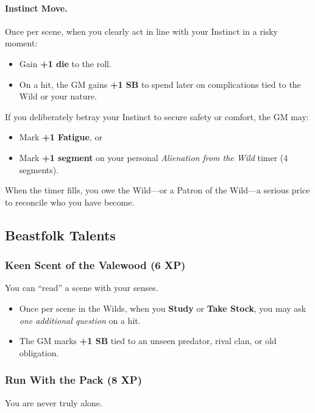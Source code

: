 \documentclass[11pt]{book}
\begin{document}
\paragraph{Instinct Move.}
Once per scene, when you clearly act in line with your Instinct in a risky moment:
\begin{itemize}
  \item Gain \textbf{+1 die} to the roll.
  \item On a hit, the GM gains \textbf{+1 SB} to spend later on complications tied to the Wild or your nature.
\end{itemize}

If you deliberately betray your Instinct to secure safety or comfort, the GM may:
\begin{itemize}
  \item Mark \textbf{+1 Fatigue}, or
  \item Mark \textbf{+1 segment} on your personal \emph{Alienation from the Wild} timer (4 segments).
\end{itemize}
When the timer fills, you owe the Wild---or a Patron of the Wild---a serious price to reconcile who you have become.

\subsection{Beastfolk Talents}
\label{subsec:beastfolk_talents}

\subsubsection{Keen Scent of the Valewood (6 XP)}
\label{talent:keen_scent_valewood}

You can ``read'' a scene with your senses.

\begin{itemize}
  \item Once per scene in the Wilds, when you \textbf{Study} or \textbf{Take Stock}, you may ask \emph{one additional question} on a hit.
  \item The GM marks \textbf{+1 SB} tied to an unseen predator, rival clan, or old obligation.
\end{itemize}

\subsubsection{Run With the Pack (8 XP)}
\label{talent:run_with_the_pack}

You are never truly alone.
\end{document}
